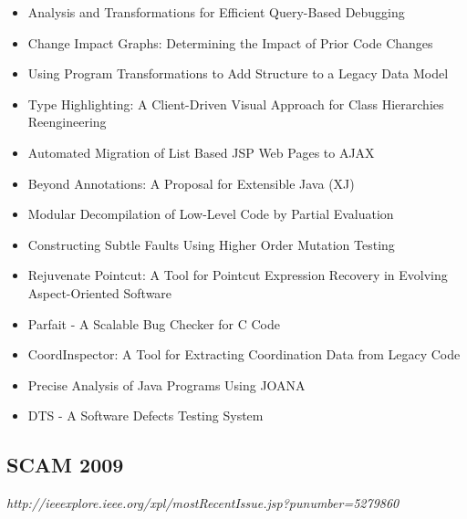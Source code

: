 {\begin{itemize}[itemsep=-1ex]
  \item Analysis and Transformations for Efficient Query-Based Debugging {\color{blue} \checkmark}{\color{red} \texttimes}
  \item Change Impact Graphs: Determining the Impact of Prior Code Changes
  \item Using Program Transformations to Add Structure to a Legacy Data Model
  \item Type Highlighting: A Client-Driven Visual Approach for Class Hierarchies Reengineering
  \item Automated Migration of List Based JSP Web Pages to AJAX
  \item Beyond Annotations: A Proposal for Extensible Java (XJ) {\color{blue} \checkmark}{\color{red} \texttimes}
  \item Modular Decompilation of Low-Level Code by Partial Evaluation {\color{blue} \checkmark}{\color{red} \texttimes}
  \item Constructing Subtle Faults Using Higher Order Mutation Testing
  \item Rejuvenate Pointcut: A Tool for Pointcut Expression Recovery in Evolving Aspect-Oriented Software
  \item Parfait - A Scalable Bug Checker for C Code {\color{blue} \checkmark}{\color{red} \texttimes}
  \item CoordInspector: A Tool for Extracting Coordination Data from Legacy Code
  \item Precise Analysis of Java Programs Using JOANA
  \item DTS - A Software Defects Testing System
\end{itemize}
}

\subsection{SCAM 2009}

{\small \em http://ieeexplore.ieee.org/xpl/mostRecentIssue.jsp?punumber=5279860}

